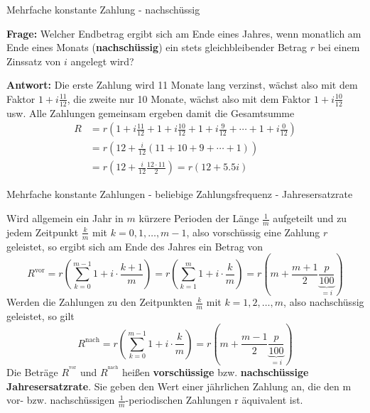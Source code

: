 \begin{frame}{Mehrfache konstante Zahlung - nachschüssig}
	\begin{example}
		\textbf{Frage: }Welcher Endbetrag ergibt sich am Ende eines Jahres, wenn monatlich am Ende eines Monats (\textbf{nachschüssig}) ein stets gleichbleibender Betrag $r$ bei einem Zinssatz von $i$ angelegt wird?
		
		\textbf{Antwort:} Die erste Zahlung wird 11 Monate lang verzinst, wächst also mit dem Faktor $1+i\frac{11}{12}$, die zweite nur 10 Monate, wächst also mit dem Faktor $1+i\frac{10}{12}$ usw. Alle Zahlungen gemeinsam ergeben damit die Gesamtsumme
		\begin{align*}
		R & = r \left( 1 + i \frac{11}{12} + 1 + i \frac{10}{12} + 1 + i \frac{9}{12} +\cdots + 1 + i \frac{0}{12} \right) \\
		& = r \left( 12 + \frac{i}{12} \left( 11 + 10 + 9 + \cdots + 1 \right) \right) \\
		& = r \left( 12 + \frac{i}{12}  \frac{12 \cdot 11}{2}\right) = r \left( 12 + 5.5 i \right)
		\end{align*}
	\end{example}	
\end{frame}


\begin{frame}{Mehrfache konstante Zahlungen - beliebige Zahlungsfrequenz - Jahresersatzrate}
	\footnotesize{
	\begin{bemerkung}
		Wird allgemein ein Jahr in $m$ kürzere Perioden der Länge $\frac{1}{m}$ aufgeteilt und zu jedem Zeitpunkt $\frac{k}{m}$ mit $k=0, 1, \ldots, m-1$, also vorschüssig eine Zahlung $r$ geleistet, so ergibt sich am Ende des Jahres ein Betrag von
		\[
		R^{\text{vor}} = r \left( \sum_{k=0}^{m-1} 1 + i \cdot \frac{k+1}{m} \right) = r \left( \sum_{k=1}^{m} 1 + i \cdot \frac{k}{m} \right) = r \left( m + \frac{m+1}{2} \underset{=i}{\underbrace{\frac{p}{100}}} \right)
		\] 
		Werden die Zahlungen zu den Zeitpunkten $\frac{k}{m}$ mit $k=1, 2, \ldots, m$, also nachschüssig geleistet, so gilt
		\[
		R^{\text{nach}} = r \left( \sum_{k=0}^{m-1} 1 + i \cdot \frac{k}{m} \right) = r \left( m + \frac{m-1}{2} \underset{=i}{\underbrace{\frac{p}{100}}} \right)
		\]
		Die Beträge $R^{^\text{vor}}$ und $R^{^\text{nach}}$ heißen \textbf{vorschüssige} bzw. \textbf{nachschüssige Jahresersatzrate}. Sie geben den Wert einer jährlichen Zahlung an, die den m vor- bzw. nachschüssigen $\frac{1}{m}$-periodischen Zahlungen r äquivalent ist.
	\end{bemerkung}}
\end{frame}

